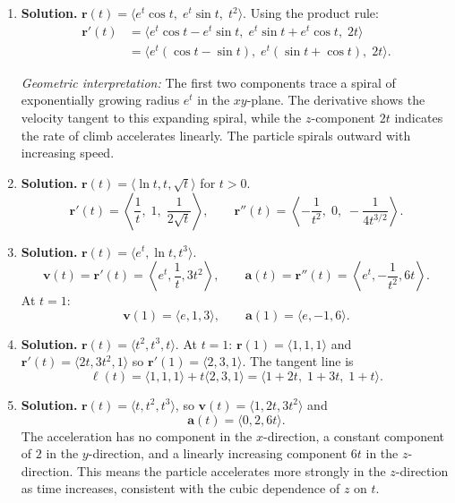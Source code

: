 \begin{enumerate}
\item \textbf{Solution.}
$\mathbf{r}(t)=\langle e^t\cos t,\; e^t\sin t,\; t^2\rangle$.
Using the product rule:
\begin{align*}
\mathbf{r}'(t) &= \langle e^t\cos t - e^t\sin t,\; e^t\sin t + e^t\cos t,\; 2t\rangle \\
&= \langle e^t(\cos t-\sin t),\; e^t(\sin t+\cos t),\; 2t\rangle.
\end{align*}

\textit{Geometric interpretation:} The first two components trace a spiral of exponentially growing radius $e^t$ in the $xy$-plane. The derivative shows the velocity tangent to this expanding spiral, while the $z$-component $2t$ indicates the rate of climb accelerates linearly. The particle spirals outward with increasing speed.

\item \textbf{Solution.}
$\mathbf{r}(t)=\langle \ln t, t, \sqrt{t}\rangle$ for $t>0$.
\[
\mathbf{r}'(t)=\left\langle \frac{1}{t},\; 1,\; \frac{1}{2\sqrt{t}}\right\rangle, \qquad \boxed{\mathbf{r}''(t)=\left\langle -\frac{1}{t^2},\; 0,\; -\frac{1}{4t^{3/2}}\right\rangle.}
\]

\item \textbf{Solution.}
$\mathbf{r}(t)=\langle e^t, \ln t, t^3\rangle$.
\[
\mathbf{v}(t)=\mathbf{r}'(t)=\left\langle e^t, \frac{1}{t}, 3t^2\right\rangle, \qquad \mathbf{a}(t)=\mathbf{r}''(t)=\left\langle e^t, -\frac{1}{t^2}, 6t\right\rangle.
\]
At $t=1$:
\[
\boxed{\mathbf{v}(1)=\langle e, 1, 3\rangle, \qquad \mathbf{a}(1)=\langle e, -1, 6\rangle.}
\]

\item \textbf{Solution.}
$\mathbf{r}(t)=\langle t^2, t^3, t\rangle$.
At $t=1$: $\mathbf{r}(1)=\langle 1,1,1\rangle$ and $\mathbf{r}'(t)=\langle 2t,3t^2,1\rangle$ so $\mathbf{r}'(1)=\langle 2,3,1\rangle$.
The tangent line is
\[
\boxed{\boldsymbol{\ell}(t)=\langle 1,1,1\rangle + t\langle 2,3,1\rangle = \langle 1+2t,\; 1+3t,\; 1+t\rangle.}
\]

\item \textbf{Solution.}
$\mathbf{r}(t)=\langle t, t^2, t^3\rangle$, so $\mathbf{v}(t)=\langle 1,2t,3t^2\rangle$ and
\[
\boxed{\mathbf{a}(t)=\langle 0, 2, 6t\rangle.}
\]
The acceleration has no component in the $x$-direction, a constant component of $2$ in the $y$-direction, and a linearly increasing component $6t$ in the $z$-direction. This means the particle accelerates more strongly in the $z$-direction as time increases, consistent with the cubic dependence of $z$ on $t$.


\end{enumerate}
